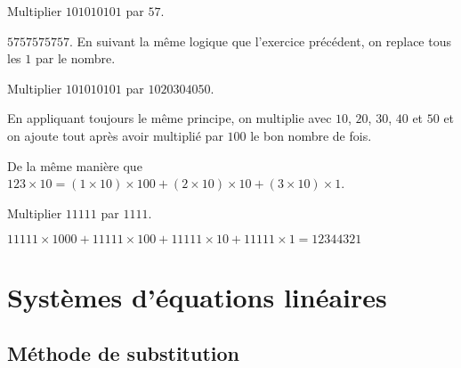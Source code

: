 \documentclass[fleqn,a4paper,nobib]{tufte-handout}
\begin{document}
\begin{exercise}
    Multiplier $101010101$ par $57$.
\end{exercise}

\begin{solution}
    \(5757575757\). En suivant la même logique que l'exercice
    précédent, on replace tous les $1$ par le nombre.
\end{solution}


\begin{exercise}
    Multiplier \(101010101\) par \(1020304050\).

    
    
\end{exercise}

\begin{solution}
    En appliquant toujours le même principe, on multiplie
    avec $10$, \(20\), \(30\), \(40\) et \(50\) et on 
    ajoute tout après avoir multiplié par $100$ le bon nombre
    de fois.

    De la même manière que $123\times10 = (1\times10)\times100 + (2\times10)\times10 + (3\times10)\times1$.

\end{solution}


\begin{exercise}
    Multiplier $11111$ par $1111$.
\end{exercise}

\begin{solution}
    $11111\times1000 + 11111\times100 + 11111\times10
    + 11111\times1
    = 12344321$

\end{solution}












\section{Systèmes d'équations linéaires}

\subsection{Méthode de substitution}
\end{document}
